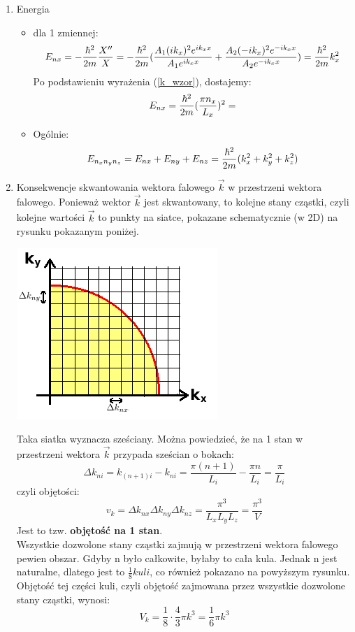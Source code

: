 \begin{enumerate}
\item Energia
\begin{itemize}
	\item dla 1 zmiennej:
\begin{equation}E_{nx}=-\frac{\hbar^2}{2m}\frac{X''}{X}=-\frac{\hbar^2}{2m}(\frac{A_1(ik_x)^2e^{ik_xx}}{A_1e^{ik_xx}}+\frac{A_2(-ik_x)^2e^{-ik_xx}}{A_2e^{-ik_xx}})=\frac{\hbar^2}{2m} k_x^2
\end{equation}
Po podstawieniu wyrażenia (\ref{k_wzor}), dostajemy:
\begin{equation}E_{nx}=\frac{\hbar^2}{2m} (\frac{\pi n_x}{L_x})^2=\end{equation}
	\item Ogólnie:
\begin{equation}E_{n_xn_yn_z}=E_{nx}+E_{ny}+E_{nz}=\frac{\hbar^2}{2m}(k_x^2+k_y^2+k_z^2)
\end{equation}
	\end{itemize}
	
\item Konsekwencje skwantowania wektora falowego $\vec{k}$ w przestrzeni wektora falowego.
Ponieważ wektor $\vec{k}$ jest skwantowany, to kolejne stany cząstki, czyli kolejne wartości $\vec{k}$ to punkty na siatce, pokazane schematycznie (w 2D) na rysunku pokazanym poniżej.\\
\begin{center}\includegraphics[scale=1]{obrazki/cwicz01_rys2.png}\end{center}
Taka siatka wyznacza sześciany. Można powiedzieć, że  na 1 stan w przestrzeni wektora $\vec{k}$ przypada sześcian o bokach:
\begin{equation} \Delta k_{ni}=k_{(n+1)i}-k_{ni}=\frac{\pi(n+1)}{L_i}-\frac{\pi n}{L_i}=\frac{\pi}{L_i} \end{equation}
czyli objętości:
\begin{equation}v_k=\Delta k_{nx}\Delta k_{ny}\Delta k_{nz}=\frac{\pi^3}{L_xL_yL_z}=\frac{\pi^3}{V}
\end{equation}
Jest to tzw. \textbf{objętość na 1 stan}.\\
Wszystkie dozwolone stany cząstki zajmują w przestrzeni wektora falowego pewien obszar. Gdyby n było całkowite, byłaby to cała kula. Jednak n jest naturalne, dlatego jest to $\frac{1}{8} kuli$, co również pokazano na powyższym rysunku.
Objętość tej części kuli, czyli objętość zajmowana przez wszystkie dozwolone stany cząstki, wynosi:
\begin{equation} V_k=\frac{1}{8}\cdot\frac{4}{3}\pi k^3=\frac{1}{6}\pi k^3
\end{equation}


\end{enumerate}
